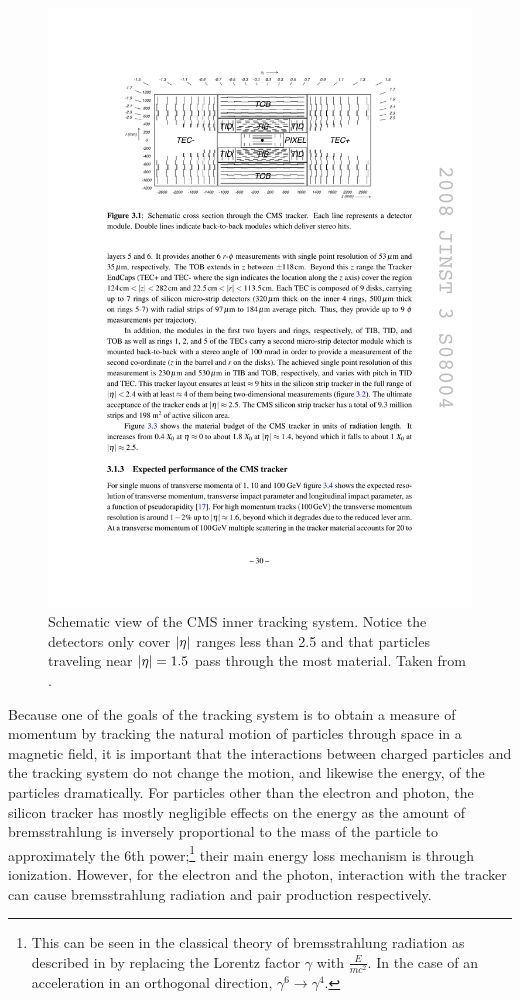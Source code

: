     \begin{figure}[h!]
      \centering
      \includegraphics[width=.7\textwidth]{figures/cms_tracker_schematic.pdf}
      \caption{Schematic view of the CMS inner tracking system. Notice the detectors only cover $\lvert \eta \rvert$ ranges less than 2.5 and that particles traveling near $\lvert \eta \rvert=1.5$ pass through the most material. Taken from \cite{cms_jinst}.}
      \label{fig:strip_tracker_geometry}
    \end{figure}

    Because one of the goals of the tracking system is to obtain a measure of momentum by tracking the natural motion of particles through space in a magnetic field, it is important that the interactions between charged particles and the tracking system do not change the motion, and likewise the energy, of the particles dramatically. For particles other than the electron and photon, the silicon tracker has mostly negligible effects on the energy as the amount of bremsstrahlung is inversely proportional to the mass of the particle to approximately the 6th power;\footnote{This can be seen in the classical theory of bremsstrahlung radiation as described in \cite[pg. 464, eq. 11.75]{griffiths_em} by replacing the Lorentz factor $\gamma$ with $\frac{E}{mc^2}$. In the case of an acceleration in an orthogonal direction, $\gamma^6 \to \gamma^4$.} their main energy loss mechanism is through ionization.\cite[sec. 33.2]{PDG} However, for the electron and the photon, interaction with the tracker can cause bremsstrahlung radiation and pair production respectively.

